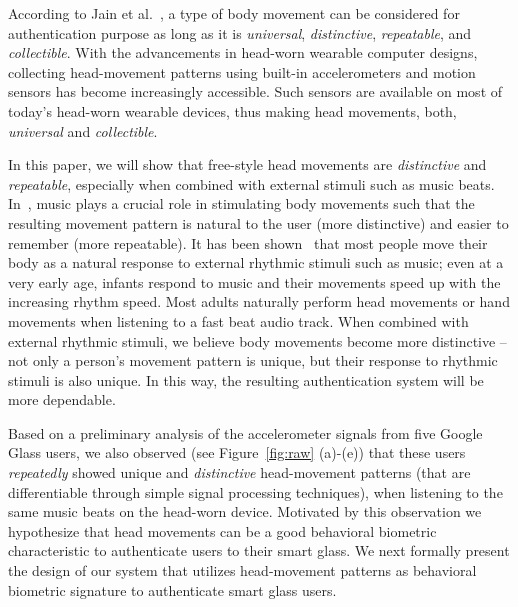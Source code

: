 
According to Jain et al.~\cite{jain2004introduction}, a type of body movement can be
considered for authentication purpose as long as it is \emph{universal}, \emph{distinctive},
\emph{repeatable}, and \emph{collectible}. With the advancements in head-worn
wearable computer designs, collecting head-movement
patterns using built-in accelerometers and motion sensors has become increasingly
accessible. Such sensors are
available on most of today's head-worn wearable devices, thus
making head movements, both, {\em universal} and \emph{collectible}.

In this paper, we will show that free-style head movements are \emph{distinctive} and \emph{repeatable}, especially when combined with external stimuli such as music beats. In~\systemname, music plays a crucial role in stimulating body movements such that the resulting movement pattern is natural to the user (more distinctive) and easier to remember (more repeatable). It has been shown~\cite{zentner2010rhythmic} that most people move
their body as a natural response to external rhythmic stimuli such as music;
even at a very early age, infants respond to music and their movements speed
up with the increasing rhythm speed. Most adults naturally perform head
movements or hand movements when listening to a fast beat audio track.  When
combined with external rhythmic stimuli, we believe body movements become more
distinctive -- not only a person's movement pattern is unique, but their
response to rhythmic stimuli is also unique. In this way, the resulting
authentication system will be more dependable.

Based on a
preliminary analysis of the accelerometer signals from five Google Glass
users, we also observed (see Figure~\ref{fig:raw} (a)-(e))
that these users
{\em repeatedly} showed unique and {\em distinctive} head-movement patterns
(that are differentiable through simple signal processing techniques),
when listening to the same music beats on the head-worn device.
Motivated by this observation we hypothesize that head movements
can be a good behavioral biometric characteristic to authenticate
users to their smart glass.
We next formally present the design of our system that
utilizes head-movement patterns as behavioral biometric signature
to authenticate smart glass users.

